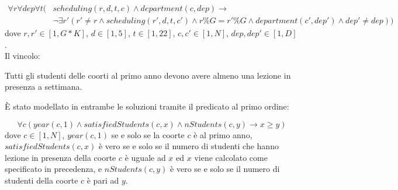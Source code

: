 \documentclass[12pt,english, openany]{book}
\begin{document}
\begin{equation}
\begin{split}
\forall r  \forall dep  \forall t (&scheduling(r,d,t,c) \wedge department(c,dep)  \rightarrow \\
                                          &\neg \exists r' (r' \neq r \wedge scheduling(r',d,t,c') \wedge r \% G = r' \% G \wedge department(c',dep')  \wedge dep' \neq dep))
\end{split}
\end{equation}
dove $r,r' \in \left[1, G*K\right]$, $d \in \left[1, 5 \right]$, $t \in \left[1, 22 \right]$, $c,c' \in \left[1, N \right]$, $dep, dep' \in \left[1, D \right]$.\\
Il vincolo:
\begin{tcolorbox}[title=\textbf{Vincolo coorti al primo anno - studenti}]
Tutti gli studenti delle coorti al primo anno devono avere almeno una lezione in presenza a settimana.
\end{tcolorbox}
È stato modellato in entrambe le soluzioni tramite il predicato al primo ordine:

\begin{equation}
\forall c (year(c,1) \wedge satisfiedStudents(c, x) \wedge nStudents(c, y) \rightarrow x \geq y)
\end{equation}
dove $c \in \left[1, N\right]$, $year(c,1)$ se e solo se la coorte $c$ è al primo anno, $satisfiedStudents(c,x)$ è vero se e solo se il numero di studenti che hanno lezione in presenza della coorte $c$ è uguale ad $x$ ed $x$ viene calcolato come specificato in precedenza, e $nStudents(c,y)$ è vero se e solo se il numero di studenti della coorte $c$ è pari ad $y$.\\
\end{document}
